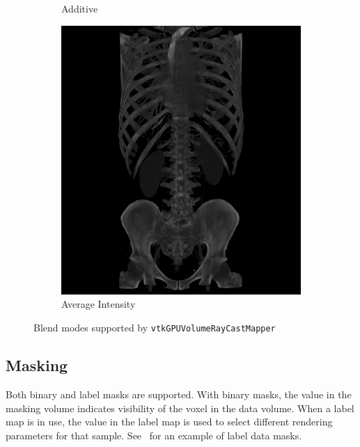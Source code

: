 \begin{figure}[htb]
\begin{subfigure}{.5\columnwidth}
    \caption{Additive}
    \label{fig:blendadditive}
  \end{subfigure}%
  \begin{subfigure}{.5\columnwidth}
    \includegraphics[width=\columnwidth]{TorsoBlendingAverage.png}
    \caption{Average Intensity}
    \label{fig:blendaverage}
  \end{subfigure}%
  \caption{Blend modes supported by \texttt{vtkGPUVolumeRayCastMapper}}
  \label{fig:blendingmodes}
\end{figure}

\subsection{Masking}
\label{masking}
Both binary and label masks are supported. With binary masks, the value in the
masking volume indicates visibility of the voxel in the data volume. When a
label map is in use, the value in the label map is used to select different
rendering parameters for that sample.  See ~for an example of label data
masks.


